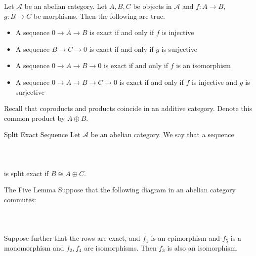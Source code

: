 \documentclass[a4paper]{article}
\begin{document}
\begin{prp}{}{} Let $\mathcal{A}$ be an abelian category. Let $A,B,C$ be objects in $\mathcal{A}$ and $f:A\to B$, $g:B\to C$ be morphisms. Then the following are true. 
\begin{itemize}
\item A sequence $0\to A\to B$ is exact if and only if $f$ is injective
\item A sequence $B\to C\to 0$ is exact if and only if $g$ is surjective
\item A sequence $0\to A\to B\to 0$ is exact if and only if $f$ is an isomorphism
\item A sequence $0\to A\to B\to C\to 0$ is exact if and only if $f$ is injective and $g$ is surjective
\end{itemize}
\end{prp}

Recall that coproducts and products coincide in an additive category. Denote this common product by $A\oplus B$. 

\begin{defn}{Split Exact Sequence}{} Let $\mathcal{A}$ be an abelian category. We say that a sequence \\~\\
\\~\\
is split exact if $B\cong A\oplus C$. 
\end{defn}

\begin{lmm}{The Five Lemma}{} Suppose that the following diagram in an abelian category commutes: \\~\\
\\~\\
Suppose further that the rows are exact, and $f_1$ is an epimorphism and $f_5$ is a monomorphism and $f_2,f_4$ are isomorphisms. Then $f_3$ is also an isomorphism. 
\end{lmm}
\end{document}
